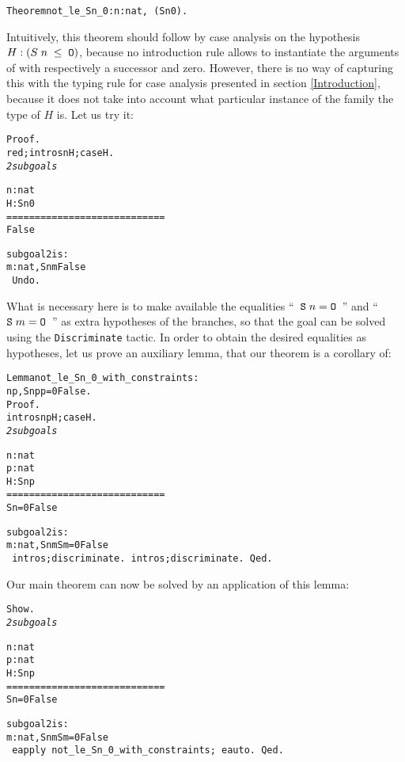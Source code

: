 \documentclass[11pt]{article}
\begin{document}
\begin{alltt}
Theorem not_le_Sn_0 : {\prodsym} n:nat, ~ (S n {\coqle} 0).
\end{alltt}

\noindent Intuitively, this theorem should follow by case analysis on
the hypothesis $H:(S\;n\;\leq\;\texttt{O})$, because no introduction rule allows
to instantiate the arguments of  with respectively a successor
and zero. However, there
is no way of capturing this with the typing rule for case analysis
presented in section \ref{Introduction}, because it does not take into
account what particular instance of the family the type of $H$ is.
Let us try it:
\begin{alltt}
Proof.
 red; intros n H; case H.
\it 2 subgoals
  
  n : nat
  H : S n {\coqle} 0
  ============================
   False

subgoal 2 is:
 {\prodsym} m : nat, S n {\coqle} m {\arrow} False
\tt
Undo.
\end{alltt}

\noindent What is necessary here is to make available the equalities
``~$\texttt{S}\;n = \texttt{O}$~'' and ``~$\texttt{S}\;m = \texttt{O}$~''
 as extra hypotheses of the
branches, so that the goal can be solved using the
\texttt{Discriminate} tactic. In order to obtain the desired
equalities as hypotheses, let us prove an auxiliary lemma, that our
theorem is a corollary of:

\begin{alltt}
 Lemma not_le_Sn_0_with_constraints :
  {\prodsym} n p , S n {\coqle} p {\arrow}  p = 0 {\arrow} False.
  Proof.
   intros n p H; case H .
\it
2 subgoals
  
  n : nat
  p : nat
  H : S n {\coqle} p
  ============================
   S n = 0 {\arrow} False

subgoal 2 is:
 {\prodsym} m : nat, S n {\coqle} m {\arrow} S m = 0 {\arrow} False
\tt
 intros;discriminate.
 intros;discriminate.
Qed.
\end{alltt}
\noindent Our main theorem can now be solved by an application of this lemma:
\begin{alltt}
Show.
\it
2 subgoals
  
  n : nat
  p : nat
  H : S n {\coqle} p
  ============================
   S n = 0 {\arrow} False

subgoal 2 is:
 {\prodsym} m : nat, S n {\coqle} m {\arrow} S m = 0 {\arrow} False
\tt
 eapply not_le_Sn_0_with_constraints; eauto.
Qed.
\end{alltt}
\end{document}
